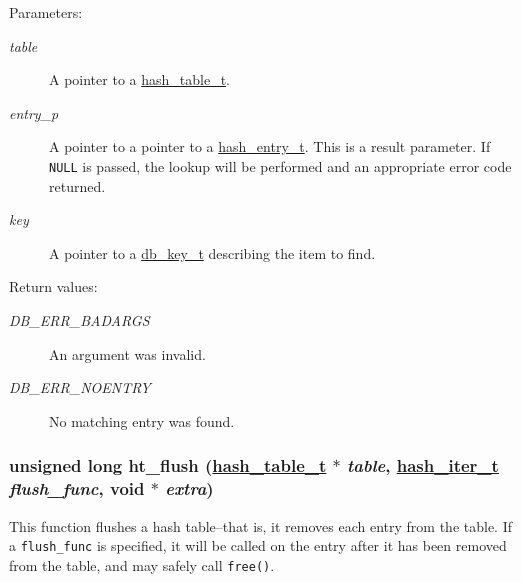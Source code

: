 \begin{Desc}
\item[Parameters:]
\begin{description}
\item[{\em table}]A pointer to a \hyperlink{group__dbprim__hash_a0}{hash\_\-table\_\-t}. \item[{\em entry\_\-p}]A pointer to a pointer to a \hyperlink{group__dbprim__hash_a1}{hash\_\-entry\_\-t}. This is a result parameter. If {\tt NULL} is passed, the lookup will be performed and an appropriate error code returned. \item[{\em key}]A pointer to a \hyperlink{group__dbprim_a0}{db\_\-key\_\-t} describing the item to find.\end{description}
\end{Desc}
\begin{Desc}
\item[Return values:]
\begin{description}
\item[{\em DB\_\-ERR\_\-BADARGS}]An argument was invalid. \item[{\em DB\_\-ERR\_\-NOENTRY}]No matching entry was found. \end{description}
\end{Desc}
\hypertarget{group__dbprim__hash_a12}{
\subsubsection[ht\_\-flush]{\setlength{\rightskip}{0pt plus 5cm}unsigned long ht\_\-flush (\hyperlink{dbprim_8h_a0}{hash\_\-table\_\-t} $\ast$ {\em table}, \hyperlink{dbprim_8h_a2}{hash\_\-iter\_\-t} {\em flush\_\-func}, void $\ast$ {\em extra})}}
\label{group__dbprim__hash_a12}


This function flushes a hash table--that is, it removes each entry from the table. If a {\tt flush\_\-func} is specified, it will be called on the entry after it has been removed from the table, and may safely call {\tt free()}.

